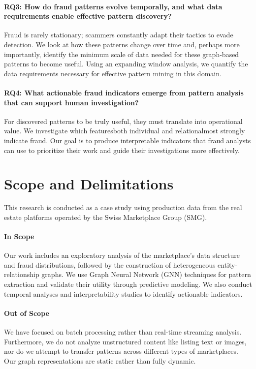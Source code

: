 \paragraph{RQ3: How do fraud patterns evolve temporally, and what data requirements enable effective pattern discovery?}
Fraud is rarely stationary; scammers constantly adapt their tactics to evade detection. We look at how these patterns change over time and, perhaps more importantly, identify the minimum scale of data needed for these graph-based patterns to become useful. Using an expanding window analysis, we quantify the data requirements necessary for effective pattern mining in this domain.

\paragraph{RQ4: What actionable fraud indicators emerge from pattern analysis that can support human investigation?}
For discovered patterns to be truly useful, they must translate into operational value. We investigate which featuresboth individual and relationalmost strongly indicate fraud. Our goal is to produce interpretable indicators that fraud analysts can use to prioritize their work and guide their investigations more effectively.

\section{Scope and Delimitations}
\label{sec:1_3}

This research is conducted as a case study using production data from the real estate platforms operated by the Swiss Marketplace Group (SMG).

\paragraph{In Scope}
Our work includes an exploratory analysis of the marketplace's data structure and fraud distributions, followed by the construction of heterogeneous entity-relationship graphs. We use Graph Neural Network (GNN) techniques for pattern extraction and validate their utility through predictive modeling. We also conduct temporal analyses and interpretability studies to identify actionable indicators.

\paragraph{Out of Scope}
We have focused on batch processing rather than real-time streaming analysis. Furthermore, we do not analyze unstructured content like listing text or images, nor do we attempt to transfer patterns across different types of marketplaces. Our graph representations are static rather than fully dynamic.

